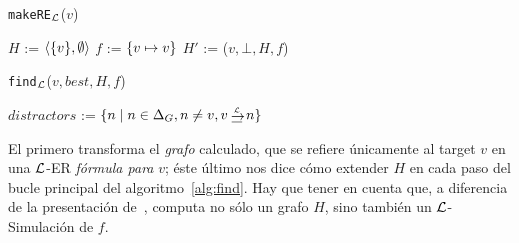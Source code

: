\begin{center}\begin{minipage}[t]{5.1cm}%
\begin{algorithm}[H]\small
{}

\caption{\small \texttt{makeRE}$_{\mathcal{L}}$($v$)}\label{alg:makeRE}


\BlankLine

\vspace{3.0pt}

\BlankLine

$H$ := $\langle \{v\},\emptyset \rangle$\; $f$ := $\{v \mapsto v\}$\;
$H'$ := \findGraph($v, \bot, H, f$)\;
\BlankLine
{}\;
\end{algorithm}
  \end{minipage}
\hspace{.05cm}
  \begin{minipage}[t]{6.8cm}%
\begin{algorithm}[H] \small
{} 


\caption{\small \texttt{find}$_{\mathcal{L}}$($v, \mathit{best},H,f$)}\label{alg:find}

 $\mathit{distractors}$ := $\cset{n \mid n \in \Delta_G, n \neq v , v \simul{\+L} n}$\;
 \;
\end{algorithm}
  \end{minipage}%
\end{center}

El primero transforma el {\em grafo} calculado, que se refiere \'unicamente al target $v$ en una $\mathcal{L}$-ER {\em
f\'ormula para} $v$; \'este \'ultimo nos dice c\'omo extender $H$ en cada paso
del bucle principal del algoritmo~\ref{alg:find}. Hay que tener en cuenta que, a diferencia de la
presentaci\'on de~\cite{graph},  computa
no s\'olo un grafo $H$, sino tambi\'en un $\mathcal{L}$-Simulaci\'on de $f$.

